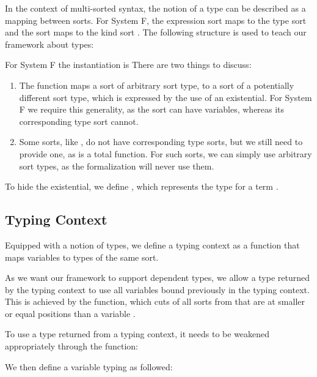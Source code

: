 \documentclass[sigplan,10pt, anonymous]{acmart}
\newenvironment{LibCode*}{%
  \begin{tcolorbox}[%
    colframe=white,%
    boxrule=0.0pt,%
    top=2.5pt,%
    left=2.5pt,%
    bottom=2.5pt,%
    right=2.5pt,%
    boxsep=0pt%
  ]\vspace{-0.2\baselineskip}%
}{%
  \vspace{-1\baselineskip}%
  \end{tcolorbox}%
}
\newcommand*\LibCode[1]{\begin{LibCode*}{#1}\end{LibCode*}}
\newcommand*\AppCode[1]{{#1}}
\newcommand*\ACode[1]{\AgdaFontStyle{\textcolor{mygray}{#1}}}
\newcommand*\AField[1]{\AgdaField{#1}}
\newcommand*\ACon[1]{\AgdaInductiveConstructor{#1}}
\newcommand*\ADef[1]{\AgdaFunction{#1}}
\begin{document}
  In the context of multi-sorted syntax, the notion of a type can be
  described as a mapping between sorts.
  For System F, the expression sort \ACode{\ACon{𝕖}} maps to the type sort
  \ACode{\ACon{𝕥}} and the sort \ACode{\ACon{𝕥}} maps to the kind sort
  \ACode{\ACon{𝕜}}.
  The following structure is used to teach our framework about types:
  \LibCode\KTypeSorts
  For System F the instantiation is
  \AppCode\FTypes
  There are two things to discuss:
  \begin{enumerate}
  \item
    The \ACode{\AField{↑ᵗ}} function maps a sort of arbitrary sort type,
    to a sort of a potentially different sort type, which is expressed
    by the use of an existential.
    For System F we require this generality, as the sort
    \ACode{\ACon{𝕥}} can have variables, whereas its corresponding type
    sort \ACode{\ACon{𝕜}} cannot.
  \item
    Some sorts, like \ACode{\ACon{𝕜}}, do not have corresponding type
    sorts, but we still need to provide one, as \ACode{\AField{↑ᵗ}} is a
    total function.
    For such sorts, we can simply use arbitrary sort types, as the
    formalization will never use them.
  \end{enumerate}
  To hide the existential, we define \ACode{S \ACon{∶⊢} s}, which represents
  the type for a term \ACode{S \ACon{⊢} s}.
  \LibCode\KTypes

  \subsection{Typing Context}
  Equipped with a notion of types, we define a typing context as a
  function that maps variables to types of the same sort.

  As we want our framework to support dependent types, we allow a type returned
  by the typing context to use all variables bound previously in the typing context.
  This is achieved by the \ACode{drop-∈} function, which cuts of all
  sorts from \ACode{S} that are at smaller or equal positions than a variable \ACode{x}.

  \LibCode\KContexts
  To use a type returned from a typing context, it needs to be
  weakened appropriately through the \ACode{\ADef{wk-telescope}} function:
  \LibCode\KContextLookup
  We then define a variable typing as followed:
  \LibCode\KVariableTyping
\end{document}
